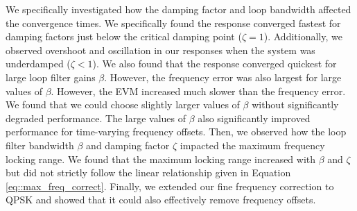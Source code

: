 \documentclass{article}
\begin{document}
We specifically investigated how the damping factor and loop bandwidth affected the convergence times. We specifically found the response converged fastest for damping factors just below the critical damping point ($\zeta = 1$). Additionally, we observed overshoot and oscillation in our responses when the system was underdamped ($\zeta < 1$). We also found that the response converged quickest for large loop filter gains $\beta$. However, the frequency error was also largest for large values of $\beta$. However, the EVM increased much slower than the frequency error. We found that we could choose slightly larger values of $\beta$ without significantly degraded performance. The large values of $\beta$ also significantly improved performance for time-varying frequency offsets. Then, we observed how the loop filter bandwidth $\beta$ and damping factor $\zeta$ impacted the maximum frequency locking range. We found that the maximum locking range increased with $\beta$ and $\zeta$ but did not strictly follow the linear relationship given in Equation \ref{eq::max_freq_correct}. Finally, we extended our fine frequency correction to QPSK and showed that it could also effectively remove frequency offsets.
\end{document}
